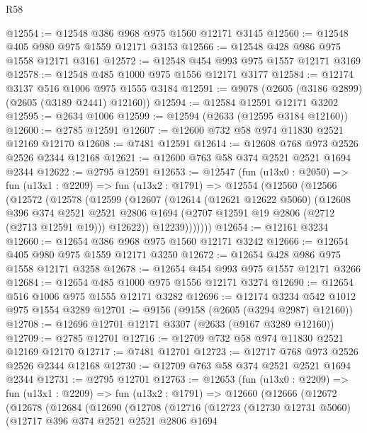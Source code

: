 \begin{lexlean}{R58}
\begin{coremodule}
@12554 := @12548 @386 @968 @975 @1560 @12171 @3145
@12560 := @12548 @405 @980 @975 @1559 @12171 @3153
@12566 := @12548 @428 @986 @975 @1558 @12171 @3161
@12572 := @12548 @454 @993 @975 @1557 @12171 @3169
@12578 := @12548 @485 @1000 @975 @1556 @12171 @3177
@12584 := @12174 @3137 @516 @1006 @975 @1555 @3184
@12591 := @9078 (@2605 (@3186 @2899) (@2605 (@3189 @2441) @12160))
@12594 := @12584 @12591 @12171 @3202
@12595 := @2634 @1006
@12599 := @12594 (@2633 (@12595 @3184 @12160))
@12600 := @2785 @12591
@12607 := @12600 @732 @58 @974 @11830 @2521 @12169 @12170
@12608 := @7481 @12591
@12614 := @12608 @768 @973 @2526 @2526 @2344 @12168
@12621 := @12600 @763 @58 @374 @2521 @2521 @1694 @2344
@12622 := @2795 @12591
@12653 := @12547
    (fun (u13x0 : @2050) =>
    fun (u13x1 : @2209) =>
    fun (u13x2 : @1791) =>
    @12554
      (@12560
        (@12566
          (@12572
            (@12578
              (@12599
                (@12607
                  (@12614
                    (@12621 @12622 @5060)
                    (@12608
                      @396
                      @374
                      @2521
                      @2521
                      @2806
                      @1694
                      (@2707 @12591 @19 @2806 (@2712 (@2713 @12591 @19)))
                      @12622))
                  @12239)))))))
@12654 := @12161 @3234
@12660 := @12654 @386 @968 @975 @1560 @12171 @3242
@12666 := @12654 @405 @980 @975 @1559 @12171 @3250
@12672 := @12654 @428 @986 @975 @1558 @12171 @3258
@12678 := @12654 @454 @993 @975 @1557 @12171 @3266
@12684 := @12654 @485 @1000 @975 @1556 @12171 @3274
@12690 := @12654 @516 @1006 @975 @1555 @12171 @3282
@12696 := @12174 @3234 @542 @1012 @975 @1554 @3289
@12701 := @9156 (@9158 (@2605 (@3294 @2987) @12160))
@12708 := @12696 @12701 @12171 @3307 (@2633 (@9167 @3289 @12160))
@12709 := @2785 @12701
@12716 := @12709 @732 @58 @974 @11830 @2521 @12169 @12170
@12717 := @7481 @12701
@12723 := @12717 @768 @973 @2526 @2526 @2344 @12168
@12730 := @12709 @763 @58 @374 @2521 @2521 @1694 @2344
@12731 := @2795 @12701
@12763 := @12653
    (fun (u13x0 : @2209) =>
    fun (u13x1 : @2209) =>
    fun (u13x2 : @1791) =>
    @12660
      (@12666
        (@12672
          (@12678
            (@12684
              (@12690
                (@12708
                  (@12716
                    (@12723
                      (@12730 @12731 @5060)
                      (@12717
                        @396
                        @374
                        @2521
                        @2521
                        @2806
                        @1694

\end{coremodule}
\end{lexlean}
